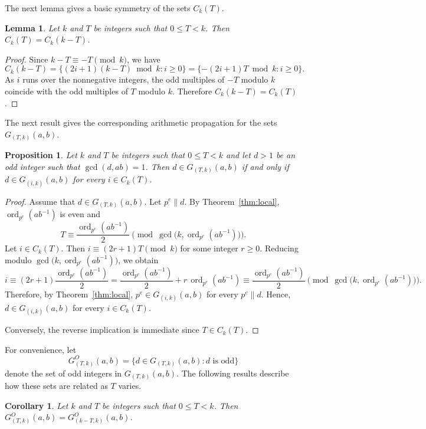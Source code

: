 \documentclass[pdflatex,sn-mathphys-num]{sn-jnl}%
\theoremstyle{thmstyleone}%
\newtheorem{proposition}[theorem]{Proposition}%
\newtheorem{lemma}[theorem]{Lemma}%
\newtheorem{corollary}[theorem]{Corollary}%
\theoremstyle{thmstyletwo}%
\theoremstyle{thmstylethree}%
\newcommand{\ord}{\operatorname{ord}}
\begin{document}
The next lemma gives a basic symmetry of the sets $C_k(T)$.

\begin{lemma}\label{lem:CkT-symmetry}
Let $k$ and $T$ be   integers  such that $0\le T<k$. Then
$
C_k(T)=C_k(k-T)$.
\end{lemma}

\begin{proof}
Since $k-T\equiv -T\pmod k$, we have
\[
C_k(k-T)=\{(2i+1)(k-T)\bmod k : i\ge 0\}
       =\{-(2i+1)T\bmod k : i\ge 0\}.
\]
As $i$ runs over the nonnegative integers, the odd multiples of $-T$ modulo $k$ coincide with the odd multiples of $T$ modulo $k$. Therefore
$
C_k(k-T)=C_k(T)$.
\end{proof}

The next result gives the corresponding arithmetic propagation for the sets $G_{(T,k)}(a,b)$.

\begin{proposition}\label{prop:CkT-good}
Let $k$ and $T$ be   integers  such that $0\le T<k$ and let $d>1$ be an odd integer such that $\gcd(d,ab)=1$. Then
$
d\in G_{(T,k)}(a,b)
$
if and only if
$
d\in G_{(i,k)}(a,b)
 $ for every $ i\in C_k(T)$.
\end{proposition}

\begin{proof}
Assume that
$
d\in G_{(T,k)}(a,b)$.
Let $p^e\parallel d$. By Theorem~\ref{thm:local},
$
\ord_{p^e}(ab^{-1})$  is even
and
\[
T\equiv \frac{\ord_{p^e}(ab^{-1})}{2}
\pmod{\gcd\bigl(k,\ord_{p^e}(ab^{-1})\bigr)}.
\]
Let $i\in C_k(T)$. Then $
i\equiv (2r+1)T \pmod k
$
for some integer $r\ge 0$. Reducing modulo $\gcd\bigl(k,\ord_{p^e}(ab^{-1})\bigr)$, we obtain
\[
i\equiv (2r+1)\frac{\ord_{p^e}(ab^{-1})}{2}
= \frac{\ord_{p^e}(ab^{-1})}{2}+r\,\ord_{p^e}(ab^{-1})
\equiv \frac{\ord_{p^e}(ab^{-1})}{2}
\pmod{\gcd\bigl(k,\ord_{p^e}(ab^{-1})\bigr)}.
\]
Therefore, by Theorem~\ref{thm:local},
$
p^e\in G_{(i,k)}(a,b)$
for every $ p^e\parallel d$.
Hence,
$
d\in G_{(i,k)}(a,b)$ for every $ i\in C_k(T)$.

Conversely,  the reverse implication is immediate since $T\in C_k(T)$.
\end{proof}

For convenience, let
\[
G^O_{(T,k)}(a,b)=\{d\in G_{(T,k)}(a,b): d \text{ is odd}\}
\]
denote the set of odd integers in $G_{(T,k)}(a,b)$. 
The following results describe how these sets are related as $T$ varies.  

\begin{corollary}\label{cor:type-k-minus-T-good} Let $k$ and $T$ be   integers  such that $0\le T<k$. Then
$
G^O_{(T,k)}(a,b)=G^O_{(k-T,k)}(a,b)$.
\end{corollary}
\end{document}
